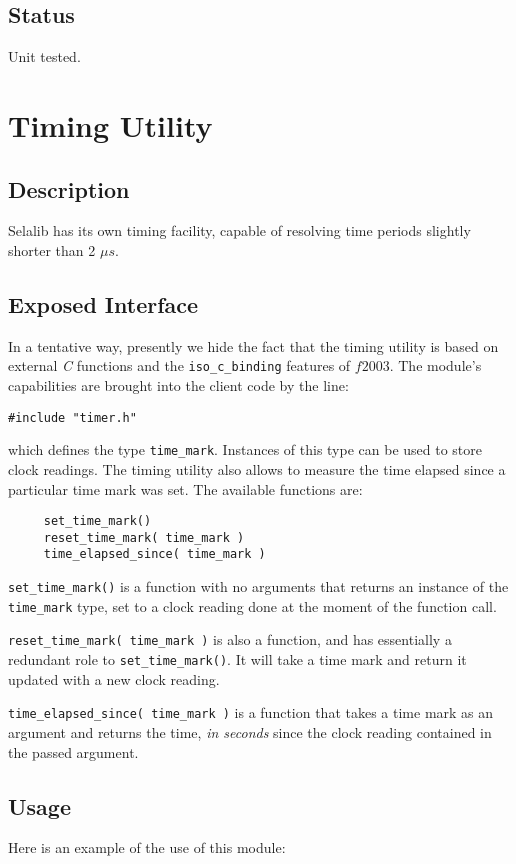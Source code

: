 \documentclass[]{report}   %
\begin{document}
\subsection{Status}
Unit tested.


\section{Timing Utility}
\subsection{Description}
Selalib has its own timing facility, capable of resolving time periods slightly shorter than 2 $\mu s$. 

\subsection{Exposed Interface}

In a tentative way, presently we hide the fact that the timing utility is based on external \emph{C} functions and the \verb+iso_c_binding+ features of $f2003$. The module's capabilities are brought into the client code by the line:
\begin{verbatim}
#include "timer.h"
\end{verbatim}
which defines the type \verb+time_mark+. Instances of this type can be used to store clock readings. The timing utility also allows to measure the time elapsed since a particular time mark was set. The available functions are:

\begin{verbatim}
     set_time_mark()
     reset_time_mark( time_mark )
     time_elapsed_since( time_mark )
\end{verbatim}

\verb+set_time_mark()+ is a function with no arguments that returns an instance of the \verb+time_mark+ type, set to a clock reading done at the moment of the function call.

\verb+reset_time_mark( time_mark )+ is also a function, and has essentially a redundant role to \verb+set_time_mark()+. It will take a time mark and return it updated with a new clock reading.

\verb+time_elapsed_since( time_mark )+ is a function that takes a time mark as an argument and returns the time, \emph{in seconds} since the clock reading contained in the passed argument.

\subsection{Usage}
Here is an example of the use of this module:
\end{document}

